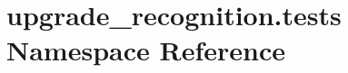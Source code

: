 \hypertarget{namespaceupgrade__recognition_1_1tests}{\section{upgrade\-\_\-recognition.\-tests Namespace Reference}
\label{namespaceupgrade__recognition_1_1tests}
}
